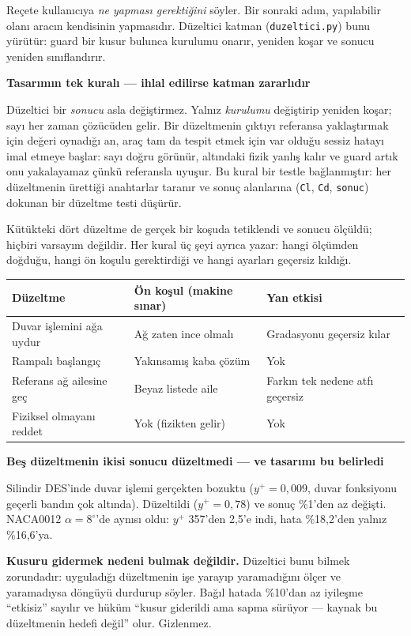\documentclass[11pt,a4paper]{article}
\newcommand{\kkkenar}{lacivert}
\newcommand{\kkzemin}{kod}
\newenvironment{renkkutu}[3]{%
  \renewcommand{\kkkenar}{#1}\renewcommand{\kkzemin}{#2}%
  \par\medskip\noindent
  \begin{lrbox}{\kutugovde}%
  \begin{minipage}{\dimexpr\linewidth-2\fboxsep-2\fboxrule\relax}\footnotesize
  \textcolor{#1}{\textbf{#3}}\par\vspace{3pt}%
}{%
  \end{minipage}%
  \end{lrbox}%
  \noindent\fcolorbox{\kkkenar}{\kkzemin}{\usebox{\kutugovde}}%
  \par\medskip
}
\newenvironment{olculdu}[1]{\begin{renkkutu}{iyi}{iyibg}{#1}}{\end{renkkutu}}
\newenvironment{dikkat}[1]{\begin{renkkutu}{orta}{ortabg}{#1}}{\end{renkkutu}}
\begin{document}
Reçete kullanıcıya \emph{ne yapması gerektiğini} söyler. Bir sonraki adım,
yapılabilir olanı aracın kendisinin yapmasıdır. Düzeltici katman
(\texttt{duzeltici.py}) bunu yürütür: guard bir kusur bulunca kurulumu onarır,
yeniden koşar ve sonucu yeniden sınıflandırır.

\begin{dikkat}{Tasarımın tek kuralı --- ihlal edilirse katman zararlıdır}
Düzeltici bir \emph{sonucu} asla değiştirmez. Yalnız \emph{kurulumu} değiştirip
yeniden koşar; sayı her zaman çözücüden gelir. Bir düzeltmenin çıktıyı referansa
yaklaştırmak için değeri oynadığı an, araç tam da tespit etmek için var olduğu
sessiz hatayı imal etmeye başlar: sayı doğru görünür, altındaki fizik yanlış
kalır ve guard artık onu yakalayamaz çünkü referansla uyuşur. Bu kural bir
testle bağlanmıştır: her düzeltmenin ürettiği anahtarlar taranır ve sonuç
alanlarına (\texttt{Cl}, \texttt{Cd}, \texttt{sonuc}) dokunan bir düzeltme
testi düşürür.
\end{dikkat}

Kütükteki dört düzeltme de gerçek bir koşuda tetiklendi ve sonucu ölçüldü;
hiçbiri varsayım değildir. Her kural üç şeyi ayrıca yazar: hangi ölçümden
doğduğu, hangi ön koşulu gerektirdiği ve hangi ayarları geçersiz kıldığı.

\begin{center}\footnotesize
\begin{tabular}{@{}lll@{}}
\toprule
\textbf{Düzeltme} & \textbf{Ön koşul (makine sınar)} & \textbf{Yan etkisi} \\
\midrule
Duvar işlemini ağa uydur & Ağ zaten ince olmalı & Gradasyonu geçersiz kılar \\
Rampalı başlangıç & Yakınsamış kaba çözüm & Yok \\
Referans ağ ailesine geç & Beyaz listede aile & Farkın tek nedene atfı geçersiz \\
Fiziksel olmayanı reddet & Yok (fizikten gelir) & Yok \\
\bottomrule
\end{tabular}
\end{center}

\begin{olculdu}{Beş düzeltmenin ikisi sonucu düzeltmedi --- ve tasarımı bu belirledi}
Silindir DES'inde duvar işlemi gerçekten bozuktu ($y^+ = 0{,}009$, duvar
fonksiyonu geçerli bandın çok altında). Düzeltildi ($y^+ = 0{,}78$) ve sonuç
\%1'den az değişti. NACA0012 $\alpha = 8^\circ$'de aynısı oldu: $y^+$ 357'den
2{,}5'e indi, hata \%18{,}2'den yalnız \%16{,}6'ya.

\textbf{Kusuru gidermek nedeni bulmak değildir.} Düzeltici bunu bilmek
zorundadır: uyguladığı düzeltmenin işe yarayıp yaramadığını ölçer ve
yaramadıysa döngüyü durdurup söyler. Bağıl hatada \%10'dan az iyileşme
``etkisiz'' sayılır ve hüküm ``kusur giderildi ama sapma sürüyor --- kaynak bu
düzeltmenin hedefi değil'' olur. Gizlenmez.
\end{olculdu}
\end{document}
